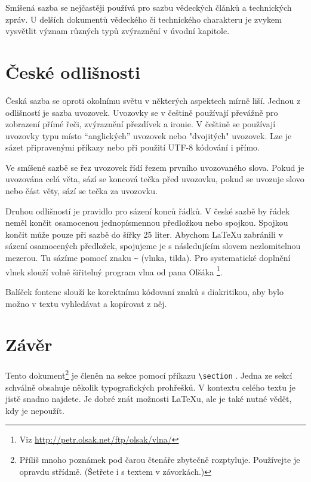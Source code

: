 \documentclass[a4 paper,10pt]{article}
\begin{document}
Smíšená sazba se nejčastěji používá pro sazbu vědeckých článků a technických zpráv. U delších dokumentů vědeckého či technického charakteru je zvykem vysvětlit význam různých typů zvýraznění v úvodní kapitole.



\section{České odlišnosti}

Česká sazba se oproti okolnímu světu v některých aspektech mírně liší. Jednou z odlišností je sazba uvozovek. Uvozovky se v češtině používají převážně pro zobrazení přímé řeči, zvýraznění přezdívek a ironie. V češtině se používají uvozovky typu  místo ``anglických'' uvozovek nebo "dvojitých" uvozovek. Lze je sázet připravenými příkazy nebo při použití UTF-8 kódování i přímo.

Ve smíšené sazbě se řez uvozovek řídí řezem prvního uvozovaného slova. Pokud je uvozována celá věta, sází se koncová tečka před uvozovku, pokud se uvozuje slovo nebo část věty, sází se tečka za uvozovku.

Druhou odlišností je pravidlo pro sázení konců řádků. V české sazbě by řádek neměl končit osamocenou jednopísmennou předložkou nebo spojkou. Spojkou  končit může pouze při sazbě do šířky 25 liter. Abychom \LaTeX u zabránili v sázení osamocených předložek, spojujeme je s následujícím slovem {\selectfont nezlomitelnou mezerou}. Tu sázíme pomocí znaku \verb|~| (vlnka, tilda). Pro systematické doplnění vlnek slouží volně šiřitelný program  {\selectfont vlna} od pana Olšáka {\footnote{Viz  \url{http://petr.olsak.net/ftp/olsak/vlna/}}}.

Balíček {\selectfont fontenc} slouží ke korektnímu kódovaní znaků s diakritikou, aby bylo možno v textu vyhledávat a kopírovat z něj.

\section{Závěr}

Tento dokument\footnote{Příliš mnoho poznámek pod čarou čtenáře zbytečně rozptyluje. Používejte je opravdu střídmě. (Šetřete i s textem v závorkách.)} je členěn na sekce pomocí příkazu  \verb|\section| . Jedna ze sekcí schválně obsahuje několik typografických prohřešků. V kontextu celého textu je jistě snadno najdete. Je dobré znát možnosti \LaTeX u, ale je také nutné vědět, kdy je nepoužít.
\end{document}
